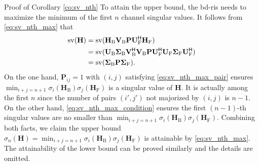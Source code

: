 \begin{appendix}
\begin{subsection}{Proof of Corollary \ref{co:sv_nth}}
	To attain the upper bound, the \gls{bd}-\gls{ris} needs to maximize the minimum of the first $n$ channel singular values.
	It follows from \eqref{eq:sv_nth_max} that
	\begin{equation*}
		\begin{split}
			\operatorname{sv}(\mathbf{H})
			 & = \operatorname{sv}(\mathbf{H}_\mathrm{B} \mathbf{V}_\mathrm{B} \mathbf{P} \mathbf{U}_\mathrm{F}^\mathsf{H} \mathbf{H}_\mathrm{F})                                                                                                                         \\
			 & = \operatorname{sv}(\mathbf{U}_\mathrm{B} \mathbf{\Sigma}_\mathrm{B} \mathbf{V}_\mathrm{B}^\mathsf{H} \mathbf{V}_\mathrm{B} \mathbf{P} \mathbf{U}_\mathrm{F}^\mathsf{H} \mathbf{U}_\mathrm{F} \mathbf{\Sigma}_\mathrm{F} \mathbf{U}_\mathrm{F}^\mathsf{H}) \\
			 & = \operatorname{sv}(\mathbf{\Sigma}_\mathrm{B} \mathbf{P} \mathbf{\Sigma}_\mathrm{F}).
		\end{split}
	\end{equation*}
	On the one hand, $\mathbf{P}_{ij}=1$ with $(i, j)$ satisfying \eqref{eq:sv_nth_max_pair} ensures $\min_{i+j=n+1} \sigma_i(\mathbf{H}_\mathrm{B}) \sigma_j(\mathbf{H}_\mathrm{F})$ is a singular value of $\mathbf{H}$.
	It is actually among the first $n$ since the number of pairs $(i',j')$ not majorized by $(i,j)$ is $n-1$.
	On the other hand, \eqref{eq:sv_nth_max_condition} ensures the first $(n-1)$-th singular values are no smaller than $\min_{i+j=n+1} \sigma_i(\mathbf{H}_\mathrm{B}) \sigma_j(\mathbf{H}_\mathrm{F})$.
	Combining both facts, we claim the upper bound $\sigma_n(\mathbf{H}) = \min_{i+j=n+1} \sigma_i(\mathbf{H}_\mathrm{B}) \sigma_j(\mathbf{H}_\mathrm{F})$ is attainable by \eqref{eq:sv_nth_max}.
	The attainability of the lower bound can be proved similarly and the details are omitted.



\end{subsection}
\end{appendix}
